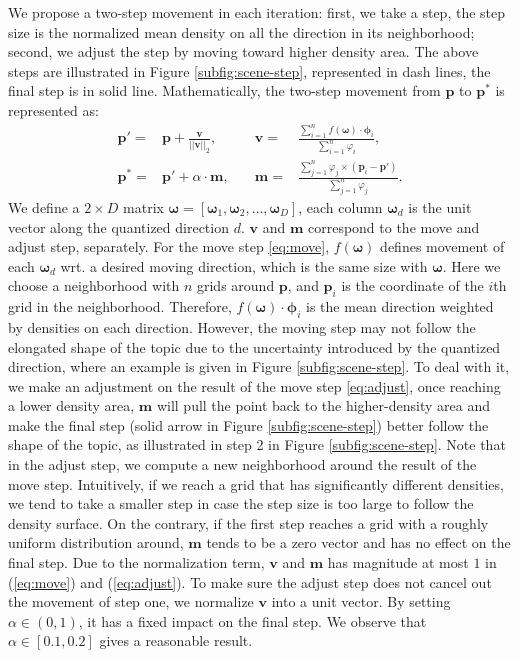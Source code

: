     We propose a two-step movement in each iteration: first, we take a step, the step size is the normalized mean density on all the direction in its neighborhood; second, we adjust the step by moving toward higher density area. 
    The above steps are illustrated in Figure \ref{subfig:scene-step}, represented in dash lines, the final step is in solid line. 
    Mathematically, the two-step movement from $\bm{p}$ to $\bm{p^*}$ is represented as:
    \begin{align}
        \bm{p}' =&\bm{p} + \frac{\bm{v}}{||\bm{v}||_2}, \quad
        & \bm{v} = & \frac{\sum_{i=1}^n{ f(\bm{\omega})\cdot\bm{\phi}_i}}{{\sum_{i=1}^n{\varphi_i}}}, \label{eq:move}\\
        \bm{p}^* =& \bm{p}' + \alpha\cdot \bm{m}, \quad
        & \bm{m} = &\frac{\sum_{j=1}^n{\varphi_j\times(\bm{p}_i-\bm{p}')}}{\sum_{j=1}^n{\varphi_j}}.\label{eq:adjust}
    \end{align}
    We define a $2\times D$ matrix $\bm{\omega} = [\bm{\omega}_1, \bm{\omega}_2, \dots, \bm{\omega}_D]$, each column $\bm{\omega}_{d}$ is the unit vector along the quantized direction $d$.
    $\bm{v}$ and $\bm{m}$ correspond to the move and adjust step, separately. 
    For the move step \ref{eq:move}, $f(\bm{\omega})$ defines movement of each $\bm{\omega}_d$ wrt. a desired moving direction, which is the same size with $\bm{\omega}$. 
    Here we choose a neighborhood with $n$ grids around $\bm{p}$, and $\bm{p}_{i}$ is the coordinate of the $i$th grid in the neighborhood. 
    Therefore, $f(\bm{\omega})\cdot\bm{\phi}_i$ is the mean direction weighted by densities on each direction. 
    However, the moving step may not follow the elongated shape of the topic due to the uncertainty introduced by the quantized direction, where an example is given in Figure \ref{subfig:scene-step}. 
    To deal with it, we make an adjustment on the result of the move step \ref{eq:adjust}, once reaching a lower density area, $\bm{m}$ will pull the point back to the higher-density area and make the final step (solid arrow in Figure \ref{subfig:scene-step}) better follow the shape of the topic, as illustrated in step 2 in Figure \ref{subfig:scene-step}.
    Note that in the adjust step, we compute a new neighborhood around the result of the move step.
    Intuitively, if we reach a grid that has significantly different densities, we tend to take a smaller step in case the step size is too large to follow the density surface. 
    On the contrary, if the first step reaches a grid with a roughly uniform distribution around, $\bm{m}$ tends to be a zero vector and has no effect on the final step.
    Due to the normalization term, $\bm{v}$ and $\bm{m}$ has magnitude at most $1$ in (\ref{eq:move}) and (\ref{eq:adjust}). 
    To make sure the adjust step does not cancel out the movement of step one, we normalize $\bm{v}$ into a unit vector. By setting $\alpha\in(0,1)$, it has a fixed impact on the final step. We observe that $\alpha\in[0.1,0.2]$ gives a reasonable result.


